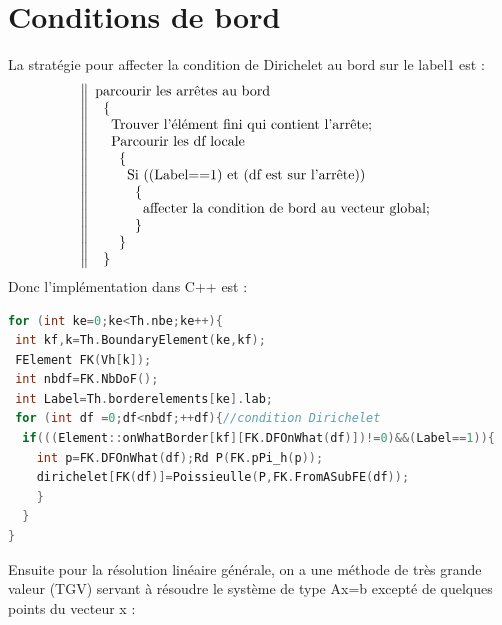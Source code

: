 \documentclass{book}
\begin{document}
\section{Conditions de bord}
La stratégie pour affecter la condition de Dirichelet au bord sur le label1 est :
\[
\left\|
\begin{array}{l}
\text{parcourir les arrêtes au bord} \\
\hspace{0.2cm} \{ \\
\hspace{0.4cm} \text{Trouver l'élément fini qui contient l'arrête;}\\
\hspace{0.4cm} \text{Parcourir les df locale} \\
\hspace{0.6cm} \{ \\
\hspace{0.8cm} \text{Si ((Label==1) et (df est sur l'arrête))} \\
\hspace{1cm}   \{ \\
\hspace{1.2cm}     \text{affecter la condition de bord au vecteur global;} \\
\hspace{1cm}   \} \\
\hspace{0.6cm} \} \\
\hspace{0.2cm} \}
\end{array}
\right.
\]
Donc l'implémentation dans C++ est :
\begin{lstlisting}[language=C]
for (int ke=0;ke<Th.nbe;ke++){
 int kf,k=Th.BoundaryElement(ke,kf);
 FElement FK(Vh[k]);
 int nbdf=FK.NbDoF();
 int Label=Th.borderelements[ke].lab;
 for (int df =0;df<nbdf;++df){//condition Dirichelet
  if(((Element::onWhatBorder[kf][FK.DFOnWhat(df)])!=0)&&(Label==1)){
    int p=FK.DFOnWhat(df);Rd P(FK.pPi_h(p));
    dirichelet[FK(df)]=Poissieulle(P,FK.FromASubFE(df)); 
    }	
  }
}
\end{lstlisting}
Ensuite pour la résolution linéaire générale, on a une méthode de très grande valeur (TGV) servant à résoudre le système de type Ax=b excepté de quelques points du vecteur x :
\end{document}
